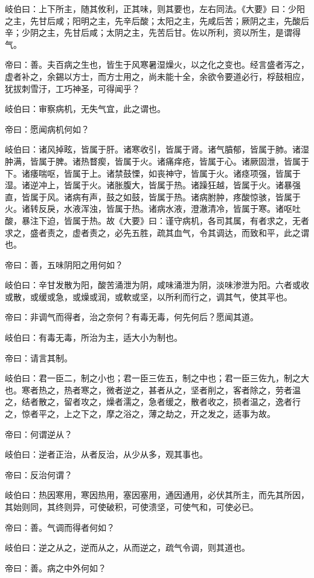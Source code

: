 \documentclass{article}%
\begin{document}
岐伯曰：上下所主，随其攸利，正其味，则其要也，左右同法。《大要》曰：少阳之主，先甘后咸；阳明之主，先辛后酸；太阳之主，先咸后苦；厥阴之主，先酸后辛；少阴之主，先甘后咸；太阴之主，先苦后甘。佐以所利，资以所生，是谓得气。

帝曰：善。夫百病之生也，皆生于风寒暑湿燥火，以之化之变也。经言盛者泻之，虚者补之，余錫以方士，而方士用之，尚未能十全，余欲令要道必行，桴鼓相应，犹拔刺雪汙，工巧神圣，可得闻乎？

岐伯曰：审察病机，无失气宜，此之谓也。

帝曰：愿闻病机何如？

岐伯曰：诸风掉眩，皆属于肝。诸寒收引，皆属于肾。诸气膹郁，皆属于肺。诸湿肿满，皆属于脾。诸热瞀瘈，皆属于火。诸痛痒疮，皆属于心。诸厥固泄，皆属于下。诸痿喘呕，皆属于上。诸禁鼓慄，如丧神守，皆属于火。诸痉项强，皆属于湿。诸逆冲上，皆属于火。诸胀腹大，皆属于热。诸躁狂越，皆属于火。诸暴强直，皆属于风。诸病有声，鼓之如鼓，皆属于热。诸病胕肿，疼酸惊骇，皆属于火。诸转反戾，水液浑浊，皆属于热。诸病水液，澄澈清冷，皆属于寒。诸呕吐酸，暴注下迫，皆属于热。故《大要》曰：谨守病机，各司其属，有者求之，无者求之，盛者责之，虚者责之，必先五胜，疏其血气，令其调达，而致和平，此之谓也。

帝曰：善，五味阴阳之用何如？

岐伯曰：辛甘发散为阳，酸苦涌泄为阴，咸味涌泄为阴，淡味渗泄为阳。六者或收或散，或缓或急，或燥或润，或軟或坚，以所利而行之，调其气，使其平也。

帝曰：非调气而得者，治之奈何？有毒无毒，何先何后？愿闻其道。

岐伯曰：有毒无毒，所治为主，适大小为制也。

帝曰：请言其制。

岐伯曰：君一臣二，制之小也；君一臣三佐五，制之中也；君一臣三佐九，制之大也。寒者热之，热者寒之，微者逆之，甚者从之，坚者削之，客者除之，劳者温之，结者散之，留者攻之，燥者濡之，急者缓之，散者收之，损者温之，逸者行之，惊者平之，上之下之，摩之浴之，薄之劫之，开之发之，适事为故。

帝曰：何谓逆从？

岐伯曰：逆者正治，从者反治，从少从多，观其事也。

帝曰：反治何谓？

岐伯曰：热因寒用，寒因热用，塞因塞用，通因通用，必伏其所主，而先其所因，其始则同，其终则异，可使破积，可使溃坚，可使气和，可使必已。

帝曰：善。气调而得者何如？

岐伯曰：逆之从之，逆而从之，从而逆之，疏气令调，则其道也。

帝曰：善。病之中外何如？
\end{document}
